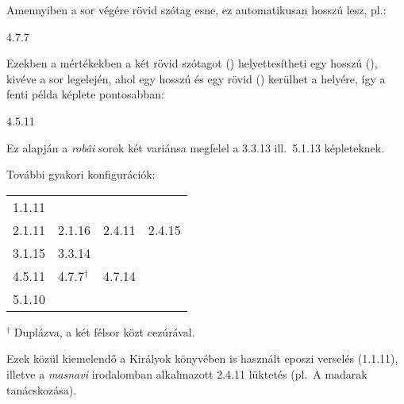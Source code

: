 Amennyiben a sor végére rövid szótag esne, ez automatikusan hosszú
lesz, pl.:
\begin{center}
4{.}7{.}7 \metra{\m\m\b\m\b\m\m}
\end{center}

Ezekben a mértékekben a két rövid szótagot (\metra{\b\b})
helyettesítheti egy hosszú (\metra{\m}), kivéve a sor legelején, ahol
egy hosszú és egy rövid (\metra{\m\b}) kerülhet a helyére, így a fenti
példa képlete pontosabban:
\begin{center}
4{.}5{.}11 \metra{\mb\b\m\m\s\b\m\b\m\s\mbb\m}
\end{center}

Ez alapján a \emph{robâi} sorok két variánsa megfelel a 3{.}3{.}13
ill.~5{.}1{.}13 képleteknek.

\bigskip

További gyakori konfigurációk:
\begin{framed}
\begin{tabular}{llll}
1{.}1{.}11 & {} & {} & {} \\
2{.}1{.}11 & 2{.}1{.}16 & 2{.}4{.}11 & 2{.}4{.}15 \\
3{.}1{.}15 & 3{.}3{.}14 & {} & {} \\
4{.}5{.}11 & 4{.}7{.}7$^\dagger$ & 4{.}7{.}14 & {} \\
5{.}1{.}10 & {} & {} & {}
\end{tabular}

$^\dagger$ Duplázva, a két félsor közt cezúrával.
\end{framed}

\bigskip

Ezek közül kiemelendő a Királyok könyvében is használt eposzi verselés (1{.}1{.}11), illetve
a \emph{masnavi} irodalomban alkalmazott 2{.}4{.}11 lüktetés (pl.~A madarak tanácskozása).

